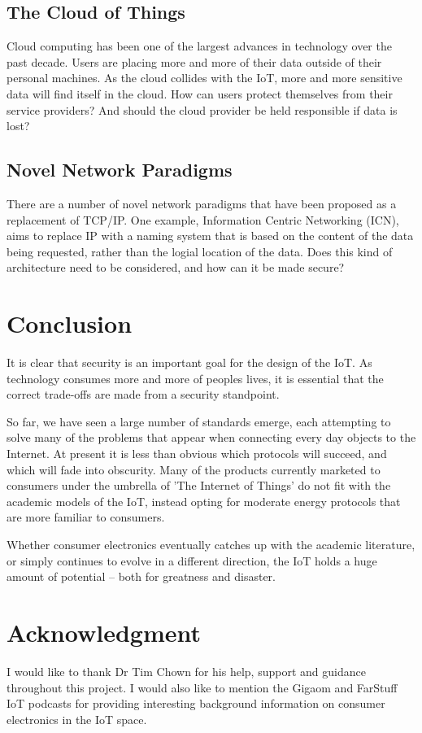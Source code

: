 \documentclass[10pt,journal,compsoc]{IEEEtran}
\begin{document}
\subsection{The Cloud of Things}
Cloud computing has been one of the largest advances in technology over the
past decade. Users are placing more and more of their data outside of their
personal machines. As the cloud collides with the IoT, more and more sensitive
data will find itself in the cloud. How can users protect themselves from their
service providers? And should the cloud provider be held responsible if data is
lost?

\subsection{Novel Network Paradigms}
There are a number of novel network paradigms that have been proposed as a
replacement of TCP/IP. One example, Information Centric Networking (ICN), aims
to replace IP with a naming system that is based on the content of the data
being requested, rather than the logial location of the data. Does this kind of
architecture need to be considered, and how can it be made secure?


\section{Conclusion}
It is clear that security is an important goal for the design of the IoT. As
technology consumes more and more of peoples lives, it is essential that the
correct trade-offs are made from a security standpoint. 

So far, we have seen a large number of standards emerge, each attempting to
solve many of the problems that appear when connecting every day objects to the
Internet. At present it is less than obvious which protocols will succeed, and
which will fade into obscurity. Many of the products currently marketed to
consumers under the umbrella of 'The Internet of Things' do not fit with the
academic models of the IoT, instead opting for moderate energy protocols that
are more familiar to consumers. 

Whether consumer electronics eventually catches up with the academic
literature, or simply continues to evolve in a different direction, the IoT
holds a huge amount of potential -- both for greatness and disaster.  


\section*{Acknowledgment}
I would like to thank Dr Tim Chown for his help, support and guidance
throughout this project. I would also like to mention the Gigaom and FarStuff
IoT podcasts for providing interesting background information on consumer
electronics in the IoT space. 
\end{document}
